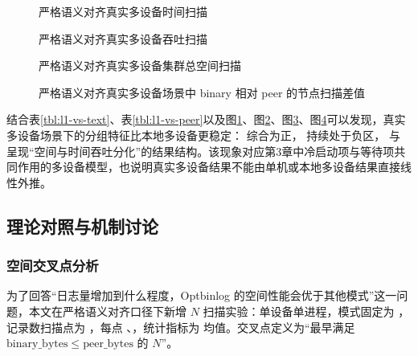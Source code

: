 \begin{figure}[H]
\centering

\caption{严格语义对齐真实多设备时间扫描}
\label{fig:l1-time-scan}
\end{figure}
\begin{figure}[H]
\centering

\caption{严格语义对齐真实多设备吞吐扫描}
\label{fig:l1-throughput-scan}
\end{figure}
\begin{figure}[H]
\centering

\caption{严格语义对齐真实多设备集群总空间扫描}
\label{fig:l1-space-scan}
\end{figure}
\begin{figure}[H]
\centering

\caption{严格语义对齐真实多设备场景中 binary 相对 peer 的节点扫描差值}
\label{fig:l1-binary-vs-peer-scan}
\end{figure}

结合表\ref{tbl:l1-vs-text}、表\ref{tbl:l1-vs-peer}以及图\ref{fig:l1-time-scan}、图\ref{fig:l1-throughput-scan}、图\ref{fig:l1-space-scan}、图\ref{fig:l1-binary-vs-peer-scan}可以发现，真实多设备场景下的分组特征比本地多设备更稳定： 综合为正， 持续处于负区， 与  呈现``空间与时间吞吐分化''的结果结构。该现象对应第3章中冷启动项与等待项共同作用的多设备模型，也说明真实多设备结果不能由单机或本地多设备结果直接线性外推。

\subsection{理论对照与机制讨论}\label{ux7406ux8bbaux5bf9ux7167ux4e0eux673aux5236ux8ba8ux8bba}

\subsubsection{空间交叉点分析}\label{ux7a7aux95f4ux4ea4ux53c9ux70b9ux5206ux6790}

为了回答``日志量增加到什么程度，Optbinlog 的空间性能会优于其他模式''这一问题，本文在严格语义对齐口径下新增 \(N\) 扫描实验：单设备单进程，模式固定为 ，记录数扫描点为 ，每点 、，统计指标为  均值。交叉点定义为``最早满足 \(\mathrm{binary\_bytes} \le \mathrm{peer\_bytes}\) 的 \(N\)''。

